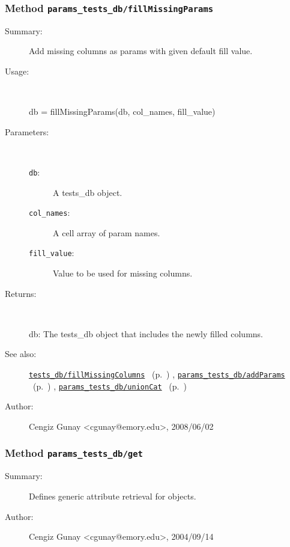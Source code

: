 \subsubsection[Method \texttt{fillMissingParams}]{Method \texttt{params\_tests\_db/fillMissingParams}}%
%
\label{ref_params_tests_db__fillMissingParams}%
\hypertarget{ref_params_tests_db__fillMissingParams}{}%
\begin{description}
\item[Summary:]Add missing columns as params with given default fill value.
%
\item[Usage:]~%
\begin{lyxcode}%
db = fillMissingParams(db, col\_names, fill\_value)
%
\end{lyxcode}%
%
%
\item[Parameters:]~
\begin{description}%
\item[\texttt{db}:]
 A tests\_db object.
\item[\texttt{col\_names}:]
 A cell array of param names.
\item[\texttt{fill\_value}:]
 Value to be used for missing columns.
\end{description}%
%
\item[Returns:
]~

	db: The tests\_db object that includes the newly filled columns.
%
%
\item[See also:]%
\hyperlink{ref_tests_db__fillMissingColumns}{\texttt{tests\_db/fillMissingColumns}}%
\ (p.~\pageref{ref_tests_db__fillMissingColumns})%
%
, \hyperlink{ref_params_tests_db__addParams}{\texttt{params\_tests\_db/addParams}}%
\ (p.~\pageref{ref_params_tests_db__addParams})%
%
, \hyperlink{ref_params_tests_db__unionCat}{\texttt{params\_tests\_db/unionCat}}%
\ (p.~\pageref{ref_params_tests_db__unionCat})%
%
%
\item[Author:]%
Cengiz Gunay <cgunay@emory.edu>, 2008/06/02 
%
\end{description}
\methodline%
\subsubsection[Method \texttt{get}]{Method \texttt{params\_tests\_db/get}}%
%
\label{ref_params_tests_db__get}%
\hypertarget{ref_params_tests_db__get}{}%
\begin{description}
\item[Summary:]Defines generic attribute retrieval for objects.
%
%
%
%
%
%
%
\item[Author:]%
Cengiz Gunay <cgunay@emory.edu>, 2004/09/14
%
\end{description}
\methodline%
